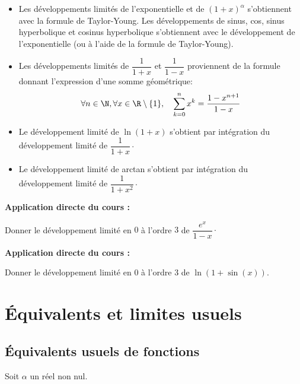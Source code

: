\documentclass[french,11pt,twoside]{VcCours}
\newenvironment{ApplicationDirecte}{\textbf{Application directe du cours :}

}{}
\begin{document}
\medskip

\begin{Remarques}{}
\begin{itemize}
\item Les développements limités de l'exponentielle et de $(1+x)^{\alpha}$ s'obtiennent avec la formule de Taylor-Young. Les développements de sinus, cos, sinus hyperbolique et cosinus hyperbolique s'obtiennent avec le développement de l'exponentielle (ou à l'aide de la formule de Taylor-Young).  
\item Les développements limités de $\dfrac{1}{1+x}$ et $\dfrac{1}{1-x}$ proviennent de la formule donnant l'expression d'une somme géométrique:
\[
\forall n\in\N,\forall x\in\R \setminus \lbrace 1 \rbrace, \quad \sum_{k=0}^n x^k=\frac{1-x^{n+1}}{1-x}
\]
\item Le développement limité de $\ln(1+x)$ s'obtient par intégration du développement limité de $\dfrac{1}{1+x}\cdot$
\item Le développement limité de arctan s'obtient par intégration du développement limité de $\dfrac{1}{1+x^2} \cdot$
\end{itemize}
\end{Remarques}

\begin{ApplicationDirecte} Donner le développement limité en $0$ à l'ordre $3$ de $\dfrac{e^x}{1-x} \cdot$
\end{ApplicationDirecte}

\begin{ApplicationDirecte} Donner le développement limité en $0$ à l'ordre $3$ de $\ln(1+\sin(x)).$
\end{ApplicationDirecte}



\section{Équivalents et limites usuels}
\subsection{Équivalents usuels de fonctions}

Soit $\alpha$ un réel non nul.
\end{document}
